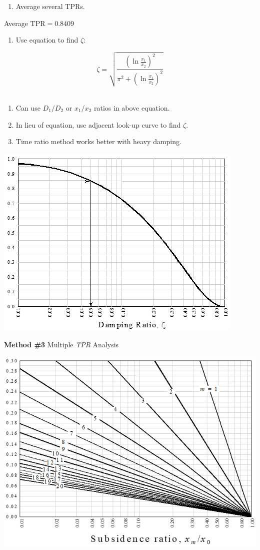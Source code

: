 \documentclass[
]{book}
\providecommand{\tightlist}{%
  \setlength{\itemsep}{0pt}\setlength{\parskip}{0pt}}
\begin{document}
\begin{enumerate}
\def\labelenumi{\arabic{enumi}.}
\setcounter{enumi}{2}
\tightlist
\item
  Average several TPRs.
\end{enumerate}

Average \(\mathrm{TPR} = 0.8409\)

\begin{enumerate}
\def\labelenumi{\arabic{enumi}.}
\setcounter{enumi}{3}
\tightlist
\item
  Use equation to find \(\zeta\):
\end{enumerate}

\[ \zeta = \sqrt{\frac{\left( \ln \frac{x_1}{x_2} \right)^2}{\pi^2 + \left( \ln \frac{x_1}{x_2} \right)^2}} \]~

\begin{enumerate}
\def\labelenumi{\alph{enumi}.}
\item
  Can use \(D_1/D_2\) or \(x_1/x_2\) ratios in above equation.
\item
  In lieu of equation, use adjacent look-up curve to find \(\zeta\).
\item
  Time ratio method works better with heavy damping.
\end{enumerate}

\includegraphics{media/08/image71.png}

\textbf{Method \#3} Multiple \emph{TPR} Analysis

\includegraphics{media/08/image72.png}
\end{document}
